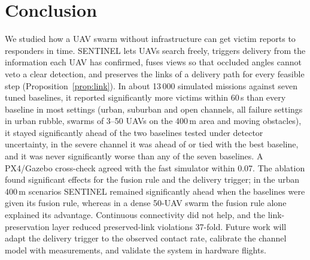 \section{Conclusion}\label{sec:conclusion}

We studied how a UAV swarm without infrastructure can get victim reports to responders in time.
SENTINEL lets UAVs search freely, triggers delivery from the information each UAV has confirmed,
fuses views so that occluded angles cannot veto a clear detection, and preserves the links of a
delivery path for every feasible step (Proposition~\ref{prop:link}). In about 13\,000 simulated missions against seven
tuned baselines, it reported significantly more victims within 60\,s than every baseline in most
settings (urban, suburban and open channels, all failure settings in urban rubble, swarms of 3--50
UAVs on the 400\,m area and moving obstacles), it stayed significantly ahead of the two baselines
tested under detector uncertainty, in the severe channel it was ahead of or tied with the best
baseline, and it was never significantly worse than any of the seven baselines. A PX4/Gazebo cross-check
agreed with the fast simulator within 0.07.
The ablation found significant effects for the fusion rule and the delivery trigger; in the urban
400\,m scenarios SENTINEL remained significantly ahead when the baselines were given its fusion rule,
whereas in a dense 50-UAV swarm the fusion rule alone explained its advantage. Continuous connectivity
did not help, and the link-preservation layer reduced preserved-link violations 37-fold. Future work will adapt the delivery trigger to the observed contact rate,
calibrate the channel model with measurements, and validate the system in hardware flights.
